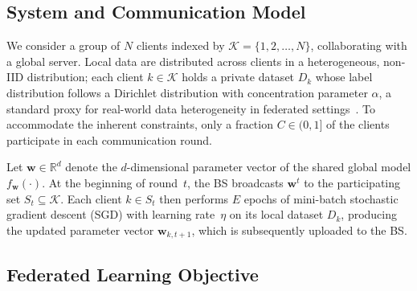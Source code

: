 \documentclass[journal]{IEEEtran}
\begin{document}
\subsection{System and Communication Model}

We consider a group of $N$ clients indexed by $\mathcal{K} = \{1, 2, \ldots, N\}$, collaborating with a global server. Local data are distributed across clients in a heterogeneous, non-IID distribution; each client $k \in \mathcal{K}$ holds a private dataset $D_k$ whose label distribution follows a Dirichlet distribution with concentration parameter $\alpha$, a standard proxy for real-world data heterogeneity in federated settings~\cite{hsieh2020non}. To accommodate the inherent constraints, only a fraction $C \in (0, 1]$ of the clients participate in each communication round.

Let $\mathbf{w} \in \mathbb{R}^d$ denote the $d$-dimensional parameter vector of the shared global model $f_{\mathbf{w}}(\cdot)$. At the beginning of round~$t$, the BS broadcasts $\mathbf{w}^t$ to the participating set $S_t \subseteq \mathcal{K}$. Each client $k \in S_t$ then performs $E$ epochs of mini-batch stochastic gradient descent (SGD) with learning rate~$\eta$ on its local dataset $D_k$, producing the updated parameter vector $\mathbf{w}_{k,t+1}$, which is subsequently uploaded to the BS.

\subsection{Federated Learning Objective}
\end{document}

